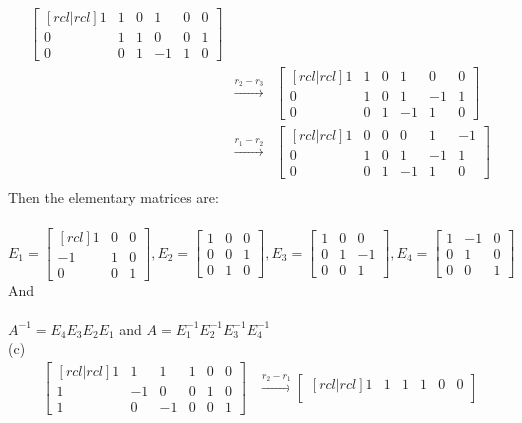 \begin{solution}
\begin{eqnarray*}
\begin{bmatrix}[rcl|rcl]
1&1&0&1&0&0\\
0&1&1&0&0&1\\
0&0&1&-1&1&0
\end{bmatrix}\\
&\xrightarrow[]{r_2-r_3}&
\begin{bmatrix}[rcl|rcl]
1&1&0&1&0&0\\
0&1&0&1&-1&1\\
0&0&1&-1&1&0
\end{bmatrix}\\
&\xrightarrow[]{r_1-r_2}&
\begin{bmatrix}[rcl|rcl]
1&0&0&0&1&-1\\
0&1&0&1&-1&1\\
0&0&1&-1&1&0
\end{bmatrix}\\
\end{eqnarray*}
Then the elementary matrices are:\\
\ \\
$E_1 =
\begin{bmatrix}[rcl]
1&0&0\\
-1&1&0\\
0&0&1
\end{bmatrix},
E_2 =
\begin{bmatrix}
1&0&0\\
0&0&1\\
0&1&0
\end{bmatrix},
E_3 = 
\begin{bmatrix}
1&0&0\\
0&1&-1\\
0&0&1
\end{bmatrix},
E_4 = 
\begin{bmatrix}
1&-1&0\\
0&1&0\\
0&0&1
\end{bmatrix}
$\\
And\\
\ \\
$A^{-1} = E_4E_3E_2E_1$ and $A=E_1^{-1}E_2^{-1}E_3^{-1}E_4^{-1}$
\\
(c) 
\begin{align*}
\begin{bmatrix}[rcl|rcl]
1&1&1&1&0&0\\
1&-1&0&0&1&0\\
1&0&-1&0&0&1
\end{bmatrix}
&\xrightarrow[]{r_2-r_1}
\begin{bmatrix}[rcl|rcl]
1&1&1&1&0&0\\

\end{bmatrix}
\end{align*}
\end{solution}
